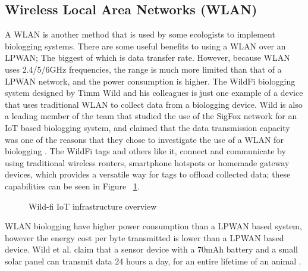 \documentclass[sigplan,screen,nonacm]{acmart}
\begin{document}
\subsection{Wireless Local Area Networks (WLAN)}
\label{subsec:Wireless Local Area Networks (WLAN)}

A WLAN is another method that is used by some ecologists to 
implement biologging systems. There are some useful benefits to using a WLAN over an LPWAN; The biggest of which is data 
transfer rate. However, because WLAN uses 2.4/5/6GHz frequencies, the range is much more limited 
than that of a LPWAN network, and the power consumption is higher. The WildFi biologging system designed by 
Timm Wild and his colleagues is just one example of a device that uses traditional 
WLAN to collect data from a biologging device. Wild is also a leading member of the 
team that studied the use of the SigFox network for an IoT based biologging system, and 
claimed that the data transmission capacity was one of the reasons that they chose to 
investigate the use of a WLAN for biologging \cite{wild2023internet}. 
The WildFi tags and others like it, connect and communicate by using traditional wireless 
routers, smartphone hotspots or homemade gateway devices, which provides a versatile way for tags to offload collected data; 
these capabilities can be seen in Figure ~\ref{fig:wild-fi_IoT_diagram}.
\begin{figure}[htbp]
  \centering
  \caption{Wild-fi IoT infrastructure overview \cite{wild2023internet}}
  \label{fig:wild-fi_IoT_diagram}
\end{figure}
WLAN biologging have higher power consumption than a LPWAN based system, however the energy cost per byte 
transmitted is lower than a LPWAN based device. Wild et al. claim that a sensor device with a 
70mAh battery and a small solar panel can transmit data 24 hours a day, for an entire lifetime of an animal \cite{wild2023internet}.
\end{document}
